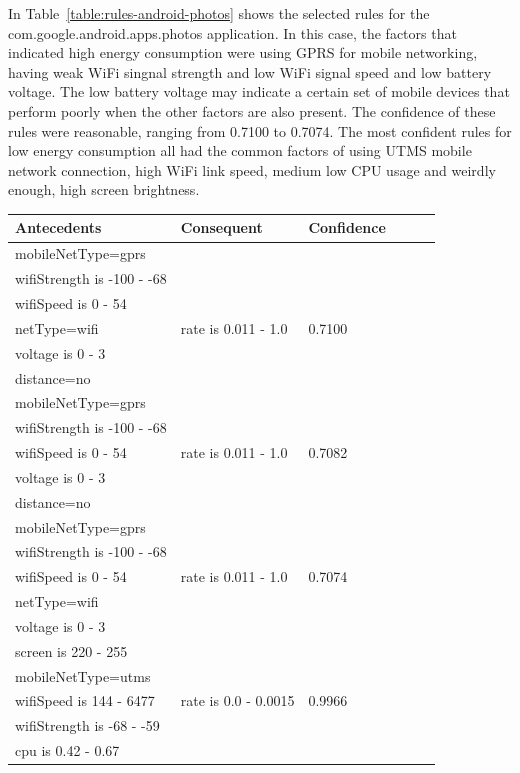 In Table~\ref{table:rules-android-photos} shows the selected rules for the com.google.android.apps.photos application. In this case, the factors that indicated high energy consumption were using GPRS for mobile networking, having weak WiFi singnal strength and low WiFi signal speed and low battery voltage. The low battery voltage may indicate a certain set of mobile devices that perform poorly when the other factors are also present. The confidence of these rules were reasonable, ranging from 0.7100 to 0.7074. The most confident rules for low energy consumption all had the common factors of using UTMS mobile network connection, high WiFi link speed, medium low CPU usage and weirdly enough, high screen brightness. 

\begin{table} \small%
\begin{tabular}{|p{5.0cm}|p{3.0cm}|p{2.0cm}|p{1.5cm}|p{0.3cm}| p{0.3cm}|}
\hline
Antecedents & Consequent & Confidence \\
\hline
	mobileNetType=gprs				& & \\
	wifiStrength is -100 - -68		& & \\
	wifiSpeed is 0 - 54				& & \\
	netType=wifi					& rate is 0.011 - 1.0 & 0.7100 \\
	voltage is 0 - 3				& & \\
	distance=no						& & \\
\hline
	mobileNetType=gprs				& & \\
	wifiStrength is -100 - -68		& & \\
	wifiSpeed is 0 - 54				&  rate is 0.011 - 1.0 & 0.7082 \\
	voltage is 0 - 3				& & \\
	distance=no						& & \\
\hline
	mobileNetType=gprs				& & \\
	wifiStrength is -100 - -68		& & \\
	wifiSpeed is 0 - 54				& rate is 0.011 - 1.0 & 0.7074 \\
	netType=wifi					& & \\
	voltage is 0 - 3				& & \\
\hline
	screen is 220 - 255				& & \\
	mobileNetType=utms				& & \\
	wifiSpeed is 144 - 6477		& rate is 0.0 - 0.0015 & 0.9966 \\
	wifiStrength is -68 - -59		& & \\
	cpu is 0.42 - 0.67				& & \\

\end{tabular}
\end{table}
